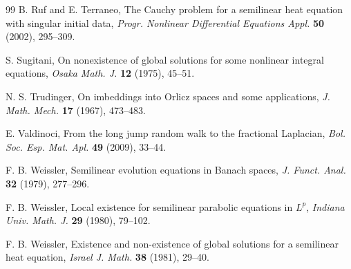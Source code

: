 \documentclass[a4paper,11pt]{amsart}
\numberwithin{equation}{section}
\theoremstyle{plain}
\theoremstyle{definition}
\begin{document}
\begin{thebibliography}{99}
B. Ruf and E. Terraneo,
The Cauchy problem for a semilinear heat equation with singular initial data,
\emph{Progr. Nonlinear Differential
Equations Appl.} {\bf 50} (2002), 295--309.


S. Sugitani,
On nonexistence of global solutions for some nonlinear integral equations,
\emph{Osaka Math. J.} \textbf{12} (1975), 45--51.

N. S. Trudinger,
On imbeddings into Orlicz spaces and some applications,
\emph{J. Math. Mech.} \textbf{17} (1967), 473--483.

E. Valdinoci,
From the long jump random walk to the fractional Laplacian,
\emph{Bol. Soc. Esp. Mat. Apl.} \textbf{49} (2009), 33--44.

F. B. Weissler,
Semilinear evolution equations in Banach spaces,
\emph{J. Funct. Anal.} \textbf{32} (1979), 277--296.

F. B. Weissler,
Local existence for semilinear parabolic equations in $L^p$,
\emph{Indiana Univ. Math. J.} \textbf{29} (1980), 79--102.

F. B. Weissler,
Existence and non-existence of global solutions for a semilinear heat equation,
\emph{Israel J. Math.} \textbf{38} (1981), 29--40.

\end{thebibliography}
\end{document}
